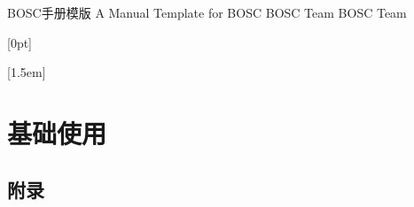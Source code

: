 \documentclass{boscmanual}
\begin{document}
\frontmatter
\titlepage%
    {BOSC手册模版} %
    {A Manual Template for BOSC} %
    {BOSC Team} %
    {BOSC Team}

[0pt]{\vspace{0.2cm}\bfseries\large}
    {\thecontentslabel\hspace{0.5em}}{}{\hfill\contentspage}

[1.5em]{\vspace{0.2cm}}
    {\contentslabel{1.5em}\hspace{0.5em}}{}{\contentspage}




\tableofcontents



\listoffigures
\listoftables
\mainmatter

\part{基础使用}



\backmatter
\chapter{附录}
\end{document}
